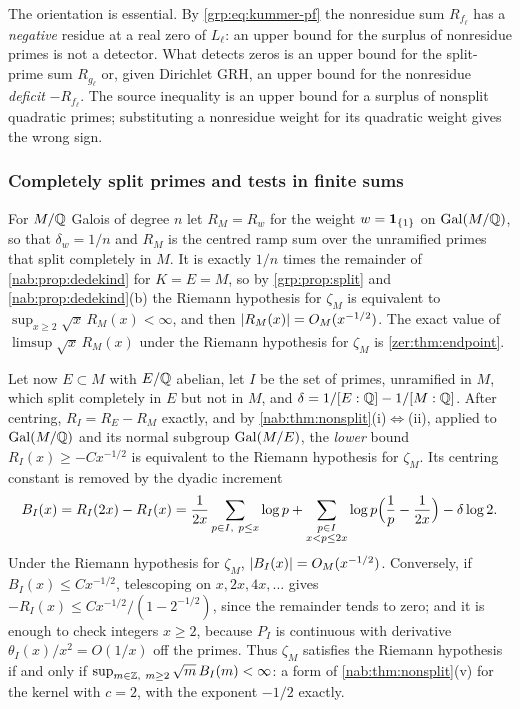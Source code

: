 The orientation is essential. By \eqref{grp:eq:kummer-pf} the nonresidue sum
$R_{f_\ell}$ has a \emph{negative} residue at a real zero of $L_\ell$: an
upper bound for the surplus of nonresidue primes is not a detector. What
detects zeros is an upper bound for the split-prime sum $R_{g_\ell}$ or,
given Dirichlet GRH, an upper bound for the nonresidue \emph{deficit}
$-R_{f_\ell}$. The source inequality is an upper bound for a surplus of
nonsplit quadratic primes; substituting a nonresidue weight for its quadratic
weight gives the wrong sign.

\subsubsection{Completely split primes and tests in finite sums}

For $M/\mathbb{Q}$ Galois of degree $n$ let $R_M=R_w$ for the weight
$w=\mathbf{1}_{\{1\}}$ on $\operatorname{Gal}(M/\mathbb{Q})$, so that $\delta_w=1/n$ and $R_M$ is the
centred ramp sum over the unramified primes that split completely in $M$. It is
exactly $1/n$ times the remainder of \cref{nab:prop:dedekind} for $K=E=M$, so by
\cref{grp:prop:split} and \cref{nab:prop:dedekind}(b) the Riemann
hypothesis for $\zeta_M$ is equivalent to $\sup_{x\ge2}\sqrt x\,R_M(x)<\infty$,
and then $\lvert R_M(x)\rvert=O_M(x^{-1/2})$. The exact value of
$\limsup\sqrt x\,R_M(x)$ under the Riemann hypothesis for $\zeta_M$ is
\cref{zer:thm:endpoint}.

Let now $E\subset M$ with $E/\mathbb{Q}$ abelian, let $I$ be the set of primes,
unramified in $M$, which split completely in $E$ but not in $M$, and
$\delta=1/[E:\mathbb{Q}]-1/[M:\mathbb{Q}]$. After centring, $R_I=R_E-R_M$ exactly, and by
\cref{nab:thm:nonsplit}\textup{(i)}$\Leftrightarrow$\textup{(ii)}, applied to
$\operatorname{Gal}(M/\mathbb{Q})$ and its normal subgroup $\operatorname{Gal}(M/E)$, the \emph{lower} bound
$R_I(x)\ge-Cx^{-1/2}$ is equivalent to the Riemann hypothesis for $\zeta_M$. Its
centring constant is removed by the dyadic increment
\begin{equation}\label{grp:eq:BI}
 B_I(x)=R_I(2x)-R_I(x)
 =\frac1{2x}\sum_{p\in I,\ p\le x}\log p
 +\sum_{\substack{p\in I\\x<p\le2x}}\log p\Bigl(\frac1p-\frac1{2x}\Bigr)
 -\delta\log2 .
\end{equation}
Under the Riemann hypothesis for $\zeta_M$, $\lvert B_I(x)\rvert=O_M(x^{-1/2})$.
Conversely, if $B_I(x)\le Cx^{-1/2}$, telescoping on $x,2x,4x,\dots$ gives
$-R_I(x)\le Cx^{-1/2}/(1-2^{-1/2})$, since the remainder tends to zero; and it
is enough to check integers $x\ge2$, because $P_I$ is continuous with
derivative $\theta_I(x)/x^2=O(1/x)$ off the primes. Thus $\zeta_M$ satisfies the
Riemann hypothesis if and only if $\sup_{m\in\mathbb{Z},\ m\ge2}\sqrt m\,B_I(m)<\infty$: a form
of \cref{nab:thm:nonsplit}\textup{(v)} for the kernel with $c=2$, with the exponent
$-1/2$ exactly.


